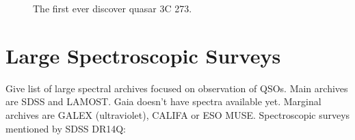 \begin{figure}
\begin{center}
\end{center}
\caption{
The first ever discover quasar 3C 273.
}
\label{3c_273}
\end{figure}


\section{Large Spectroscopic Surveys}
\label{large_spec_surveys}

Give list of large spectral archives focused on observation of QSOs.
Main archives are SDSS and LAMOST.
Gaia doesn't have spectra available yet.
Marginal archives are GALEX (ultraviolet), CALIFA or ESO MUSE.
Spectroscopic surveys mentioned by SDSS DR14Q:

